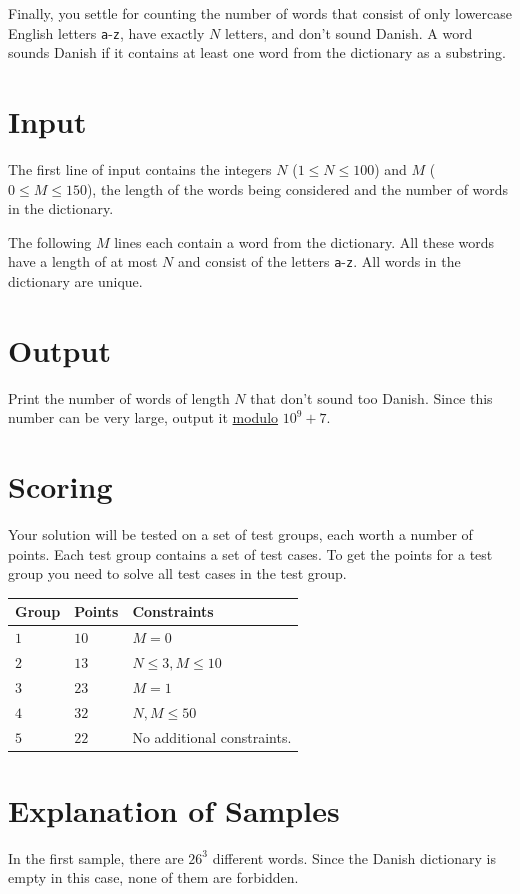 Finally, you settle for counting the number of words that consist of only lowercase English letters 
\texttt{a}-\texttt{z}, have exactly $N$ letters, and don't sound Danish. A word sounds Danish if it contains 
at least one word from the dictionary as a substring.

\section*{Input}
The first line of input contains the integers $N$ ($1 \leq N \leq 100$) and $M$ ($0 \leq M \leq 150$), 
the length of the words being considered and the number of words in the dictionary.

The following $M$ lines each contain a word from the dictionary. All these words have a length of at most $N$ 
and consist of the letters \texttt{a}-\texttt{z}. All words in the dictionary are unique.

\section*{Output}
Print the number of words of length $N$ that don't sound too Danish. Since this number can be very large, 
output it \href{https://en.wikipedia.org/wiki/Modulo}{modulo} $10^9+7$. 

\section*{Scoring}
Your solution will be tested on a set of test groups, each worth a number of points. Each test group contains
a set of test cases. To get the points for a test group you need to solve all test cases in the test group.

\noindent
\begin{tabular}{| l | l | p{12cm} |}
  \hline
  \textbf{Group} & \textbf{Points} & \textbf{Constraints} \\ \hline
  $1$    & $10$       & $M = 0$ \\ \hline
  $2$    & $13$       & $N \leq 3, M \leq 10$ \\ \hline
  $3$    & $23$       & $M = 1$ \\ \hline
  $4$    & $32$       & $N, M \leq 50$ \\ \hline
  $5$    & $22$       & No additional constraints. \\ \hline
\end{tabular}

\section*{Explanation of Samples}
In the first sample, there are $26^3$ different words. Since the Danish dictionary is empty in this case, none of them are forbidden.
